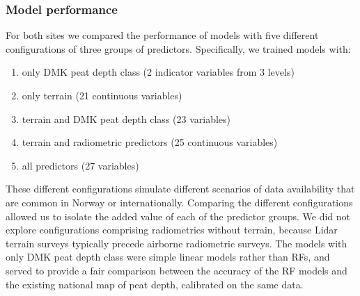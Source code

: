 \documentclass[soil, manuscript]{copernicus}
\providecommand{\tightlist}{%
  \setlength{\itemsep}{0pt}\setlength{\parskip}{0pt}}
\begin{document}
\subsubsection{Model performance}

For both sites we compared the performance of models with five different configurations of three groups of predictors.
Specifically, we trained models with:

\begin{enumerate}
\def\labelenumi{\arabic{enumi}.}
\tightlist
\item
  only DMK peat depth class (2 indicator variables from 3 levels)
\item
  only terrain (21 continuous variables)
\item
  terrain and DMK peat depth class (23 variables)
\item
  terrain and radiometric predictors (25 continuous variables)
\item
  all predictors (27 variables)
\end{enumerate}

These different configurations simulate different scenarios of data availability that are common in Norway or internationally.
Comparing the different configurations allowed us to isolate the added value of each of the predictor groups.
We did not explore configurations comprising radiometrics without terrain, because Lidar terrain surveys typically precede airborne radiometric surveys.
The models with only DMK peat depth class were simple linear models rather than RFs, and served to provide a fair comparison between the accuracy of the RF models and the existing national map of peat depth, calibrated on the same data.
\end{document}
